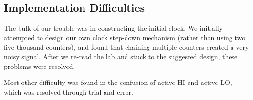 \documentclass[paper=letter, fontsize=11pt]{scrartcl}
\begin{document}
\subsection{Implementation Difficulties}
The bulk of our trouble was in constructing the initial clock. We initially attempted to design our own clock step-down mechanism (rather than using two five-thousand counters), and found that chaining multiple counters created a very noisy signal. After we re-read the lab and stuck to the suggested design, these problems were resolved.

Most other difficulty was found in the confusion of active HI and active LO, which was resolved through trial and error.

\end{document}
